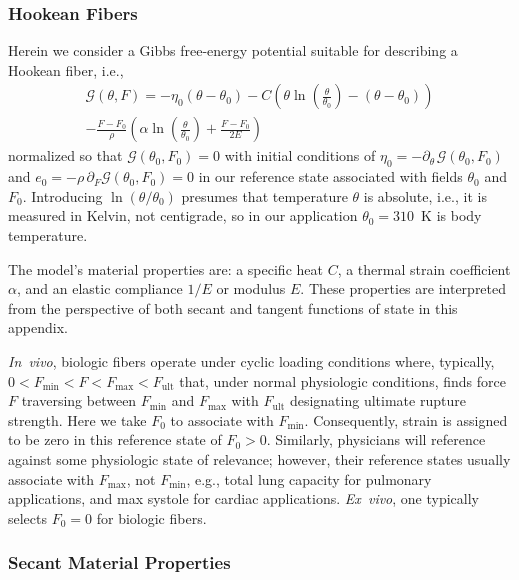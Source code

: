 \subsubsection{Hookean Fibers}

Herein we consider a Gibbs free-energy potential suitable for describing a Hookean fiber, i.e.,
\begin{multline}
    \mathcal{G} (\theta , F) = -\eta_0 (\theta - \theta_0) -
    C \left( \theta \ln \left( \frac{\theta}{\theta_0} \right) - (\theta - \theta_0) \right) \\ - 
    \frac{F - F_0}{\rho} \left( \alpha \ln \left( \frac{\theta}{\theta_0} \right) + \frac{F - F_0}{2E}  \right)
    \label{GreenFiberEnergy}
\end{multline}
normalized so that $\mathcal{G}(\theta_0 , F_0) = 0$ with initial conditions of $\eta_0 = -\partial_{\theta\,} \mathcal{G} (\theta_0 , F_0)$ and $e_0 = -\rho \, \partial_F \mathcal{G} (\theta_0 , F_0) = 0$ in our reference state associated with fields $\theta_0$ and $F_0$.  Introducing $\ln ( \theta / \theta_0 )$ presumes that temperature $\theta$ is absolute, i.e., it is measured in Kelvin, not centigrade, so in our application $\theta_0 = 310$~K is body temperature.

The model's material properties are: a specific heat $C$, a thermal strain coefficient $\alpha$, and an elastic compliance $1/E$ or modulus $E$.  These properties are interpreted from the perspective of both secant and tangent functions of state in this appendix.

\textit{In~vivo}, biologic fibers operate under cyclic loading conditions where, typically, \mbox{$0 < F_{\min} < F < F_{\max} < F_{\mathrm{ult}}$} that, under normal physiologic conditions, finds force $F$ traversing between $F_{\min}$ and $F_{\max}$ with $F_{\mathrm{ult}}$ designating ultimate rupture strength.  Here we take $F_0$ to associate with $F_{\min}$.  Consequently, strain is assigned to be zero in this reference state of $F_0>0$.  Similarly, physicians will reference against some physiologic state of relevance; however, their reference states usually associate with $F_{\max}$, not $F_{\min}$, e.g., total lung capacity for pulmonary applications, and max systole for cardiac applications.  \textit{Ex~vivo}, one typically selects $F_0 = 0$ for biologic fibers.

\subsubsection{Secant Material Properties}

